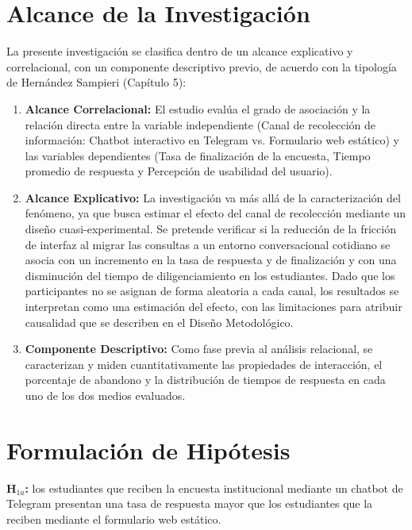 \documentclass[12pt,letterpaper]{article}
\begin{document}
\section{Alcance de la Investigación}

La presente investigación se clasifica dentro de un alcance explicativo y correlacional, con un componente descriptivo previo, de acuerdo con la tipología de Hernández Sampieri (Capítulo 5):

\begin{enumerate}
\item \textbf{Alcance Correlacional:} El estudio evalúa el grado de asociación y la relación directa entre la variable independiente (Canal de recolección de información: Chatbot interactivo en Telegram vs. Formulario web estático) y las variables dependientes (Tasa de finalización de la encuesta, Tiempo promedio de respuesta y Percepción de usabilidad del usuario).


\item \textbf{Alcance Explicativo:} La investigación va más allá de la caracterización del fenómeno, ya que busca estimar el efecto del canal de recolección mediante un diseño cuasi-experimental. Se pretende verificar si la reducción de la fricción de interfaz al migrar las consultas a un entorno conversacional cotidiano se asocia con un incremento en la tasa de respuesta y de finalización y con una disminución del tiempo de diligenciamiento en los estudiantes. Dado que los participantes no se asignan de forma aleatoria a cada canal, los resultados se interpretan como una estimación del efecto, con las limitaciones para atribuir causalidad que se describen en el Diseño Metodológico.

\item \textbf{Componente Descriptivo:} Como fase previa al análisis relacional, se caracterizan y miden cuantitativamente las propiedades de interacción, el porcentaje de abandono y la distribución de tiempos de respuesta en cada uno de los dos medios evaluados.


\end{enumerate}


\section{Formulación de Hipótesis}
\textbf{H$_{1a}$:} los estudiantes que reciben la encuesta institucional mediante un chatbot de Telegram presentan una tasa de respuesta mayor que los estudiantes que la reciben mediante el formulario web estático.
\end{document}
